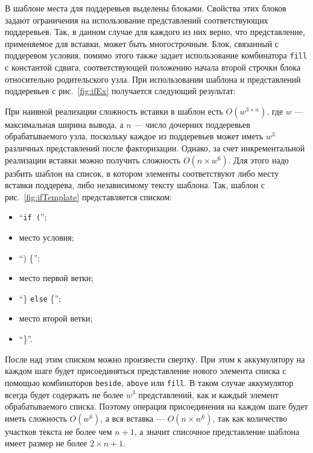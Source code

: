 В шаблоне места для поддеревьев выделены блоками. Свойства этих блоков задают
ограничения на использование представлений соответствующих поддеревьев.
Так, в данном случае для каждого из них верно,
что представление, применяемое для вставки, может быть многострочным. Блок, связанный
с поддеревом условия, помимо этого также задает использование комбинатора
\lstinline{fill} с константой сдвига, соответствующей положению начала
второй строчки блока относительно родительского узла.
При использовании шаблона и представлений
поддеревьев с рис.~\ref{fig:ifEx} получается следующий результат:

  

При наивной реализации сложность вставки в шаблон есть
$O(w^{3\times n})$, где $w$ --- максимальная ширина вывода,
а $n$ --- число дочерних поддеревьев обрабатываемого узла,
поскольку каждое из поддеревьев может иметь $w^3$ различных
представлений после факторизации.
Однако, за счет инкрементальной реализации вставки
можно получить сложность $O(n \times w^6)$.
Для этого надо разбить шаблон на список, в котором элементы соответствуют
либо месту вставки поддерева, либо независимому тексту шаблона. Так, шаблон
с рис.~\ref{fig:ifTemplate} представляется списком:
\begin{itemize}
  \item ``\lstinline{if (}'';
  \item место условия;
  \item ``) \{'';
  \item место первой ветки;
  \item ``\} \lstinline{else} \{'';
  \item место второй ветки;
  \item ``\}''.
\end{itemize}

После над этим списком можно произвести свертку. При этом к аккумулятору на каждом
шаге будет присоединяться представление нового элемента списка с помощью
комбинаторов \lstinline{beside}, \lstinline{above} или \lstinline{fill}. 
В таком случае аккумулятор всегда будет содержать не более
$w^3$ представлений, как и каждый элемент обрабатываемого списка.
Поэтому операция присоединения
на каждом шаге будет иметь сложность $O(w^6)$, а вся вставка ---
$O(n \times w^6)$, так как количество участков текста не более чем $n + 1$, а значит
списочное представление шаблона имеет размер не более $2 \times n + 1$.

